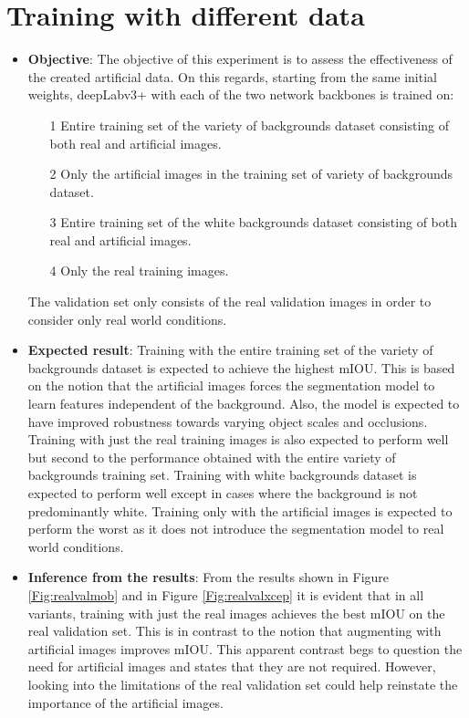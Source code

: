 \section{Training with different data}

	\begin{itemize}
		\item \textbf{Objective}: The objective of this experiment is to assess the effectiveness of the created artificial data. On this regards, starting from the same initial weights, deepLabv3+ with each of the two network backbones is trained on:
		\begin{itemize}
			\item[1] Entire training set of the variety of backgrounds dataset consisting of both real and artificial images.
			\item[2] Only the artificial images in the training set of variety of backgrounds dataset.
			\item[3] Entire training set of the white backgrounds dataset consisting of both real and artificial images.
			\item[4] Only the real training images.
		\end{itemize}
	The validation set only consists of the real validation images in order to consider only real world conditions.
		\item \textbf{Expected result}: Training with the entire training set of the variety of backgrounds dataset is expected to achieve the highest mIOU. This is based on the notion that the artificial images forces the segmentation model to learn features independent of the background. Also, the model is expected to have improved robustness towards varying object scales and occlusions. Training with just the real training images is also expected to perform well but second to the performance obtained with the entire variety of backgrounds training set. Training with white backgrounds dataset is expected to perform well except in cases where the background is not predominantly white. Training only with the artificial images is expected to perform the worst as it does not introduce the segmentation model to real world conditions.
		\item \textbf{Inference from the results}: From the results shown in Figure \ref{Fig:realvalmob} and in Figure \ref{Fig:realvalxcep} it is evident that in all variants, training with just the real images achieves the best mIOU on the real validation set. This is in contrast to the notion that augmenting with artificial images improves mIOU. This apparent contrast begs to question the need for artificial images and states that they are not required. However, looking into the limitations of the real validation set could help reinstate the importance of the artificial images.

\end{itemize}
